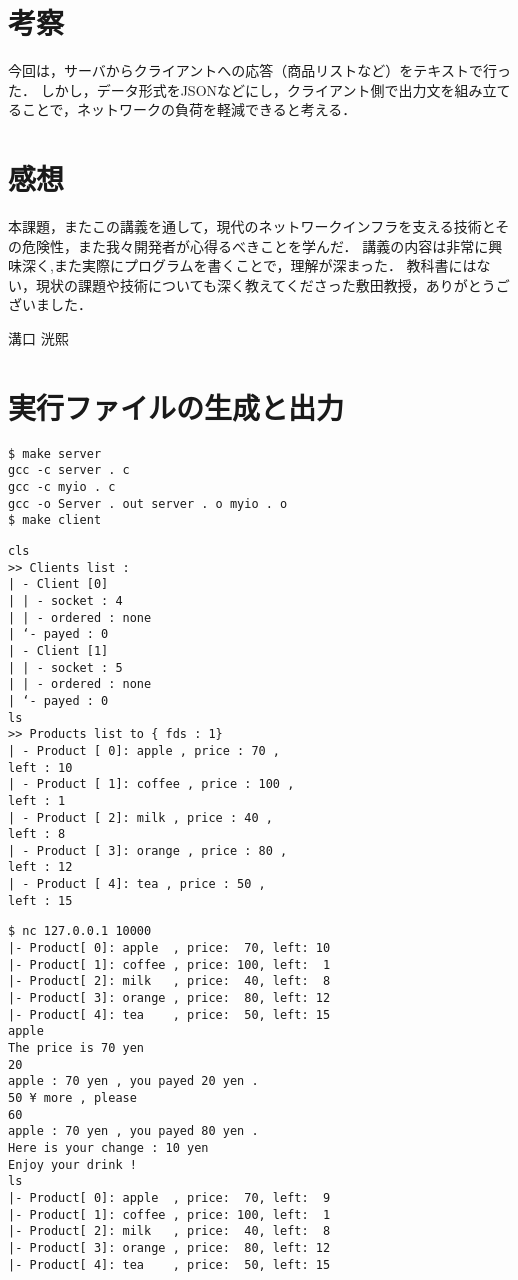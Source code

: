 \documentclass[12pt,dvipdfmx]{jlreq}
\begin{document}
\section*{考察}
今回は，サーバからクライアントへの応答（商品リストなど）をテキストで行った．
しかし，データ形式をJSONなどにし，クライアント側で出力文を組み立てることで，ネットワークの負荷を軽減できると考える．
\section*{感想}
本課題，またこの講義を通して，現代のネットワークインフラを支える技術とその危険性，また我々開発者が心得るべきことを学んだ．
講義の内容は非常に興味深く,また実際にプログラムを書くことで，理解が深まった．
教科書にはない，現状の課題や技術についても深く教えてくださった敷田教授，ありがとうございました．
\begin{flushright}
    溝口 洸熙
\end{flushright}
\newpage
\section*{実行ファイルの生成と出力}
\begin{center}
    \begin{minipage}[t]{.48\textwidth}
        \begin{lstlisting}[caption=実行ファイルの生成]
$ make server
gcc -c server . c
gcc -c myio . c
gcc -o Server . out server . o myio . o
$ make client
        \end{lstlisting}
        \begin{lstlisting}[caption={サーバ側の出力}]
cls
>> Clients list :
| - Client [0]
| | - socket : 4
| | - ordered : none
| ‘- payed : 0
| - Client [1]
| | - socket : 5
| | - ordered : none
| ‘- payed : 0
ls
>> Products list to { fds : 1}
| - Product [ 0]: apple , price : 70 ,
left : 10
| - Product [ 1]: coffee , price : 100 ,
left : 1
| - Product [ 2]: milk , price : 40 ,
left : 8
| - Product [ 3]: orange , price : 80 ,
left : 12
| - Product [ 4]: tea , price : 50 ,
left : 15
        \end{lstlisting}
    \end{minipage}
    \begin{minipage}[t]{.48\textwidth}
        \begin{lstlisting}[caption={クライアント側出力例}]
$ nc 127.0.0.1 10000
|- Product[ 0]: apple  , price:  70, left: 10
|- Product[ 1]: coffee , price: 100, left:  1
|- Product[ 2]: milk   , price:  40, left:  8
|- Product[ 3]: orange , price:  80, left: 12
|- Product[ 4]: tea    , price:  50, left: 15
apple
The price is 70 yen
20
apple : 70 yen , you payed 20 yen .
50 ¥ more , please
60
apple : 70 yen , you payed 80 yen .
Here is your change : 10 yen
Enjoy your drink !
ls
|- Product[ 0]: apple  , price:  70, left:  9
|- Product[ 1]: coffee , price: 100, left:  1
|- Product[ 2]: milk   , price:  40, left:  8
|- Product[ 3]: orange , price:  80, left: 12
|- Product[ 4]: tea    , price:  50, left: 15
        \end{lstlisting}
    \end{minipage}
\end{center}
\end{document}
